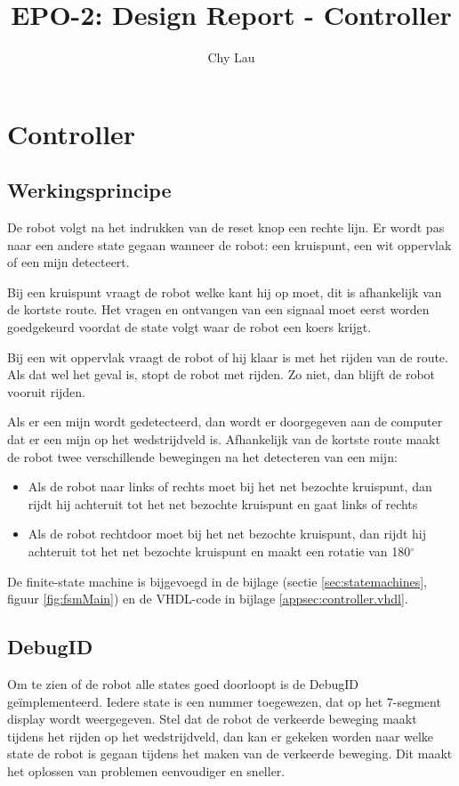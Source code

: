 \documentclass{report}
\title{EPO-2: Design Report - Controller}
\author{Chy Lau}
\begin{document}
\chapter{Controller}
\label{ch:controller}

\section{Werkingsprincipe}
De robot volgt na het indrukken van de reset knop een rechte lijn.
Er wordt pas naar een andere state gegaan wanneer de robot: een kruispunt, een wit oppervlak of een mijn detecteert.


Bij een kruispunt vraagt de robot welke kant hij op moet, dit is afhankelijk van de kortste route.
Het vragen en ontvangen van een signaal moet eerst worden goedgekeurd voordat de state volgt waar de robot een koers krijgt.


Bij een wit oppervlak vraagt de robot of hij klaar is met het rijden van de route.
Als dat wel het geval is, stopt de robot met rijden.
Zo niet, dan blijft de robot vooruit rijden.

Als er een mijn wordt gedetecteerd, dan wordt er doorgegeven aan de computer dat er een mijn op het wedstrijdveld is. 
Afhankelijk van de kortste route maakt de robot twee verschillende bewegingen na het detecteren van een mijn:
\begin{itemize}
\item Als de robot naar links of rechts moet bij het net bezochte kruispunt, dan rijdt hij achteruit tot het net bezochte kruispunt en gaat links of rechts
\item Als de robot rechtdoor moet bij het net bezochte kruispunt, dan rijdt hij achteruit tot het net bezochte kruispunt en maakt een rotatie van 180$^\circ$
\end{itemize}

De finite-state machine is bijgevoegd in de bijlage (sectie \ref{sec:statemachines}, figuur \ref{fig:fsmMain}) en de VHDL-code in bijlage \ref{appsec:controller.vhdl}.

\section{DebugID}
Om te zien of de robot alle states goed doorloopt is de DebugID geïmplementeerd.
Iedere state is een nummer toegewezen, dat op het 7-segment display wordt weergegeven.
Stel dat de robot de verkeerde beweging maakt tijdens het rijden op het wedstrijdveld, dan kan er gekeken worden naar welke state de robot is gegaan tijdens het maken van de verkeerde beweging.
Dit maakt het oplossen van problemen eenvoudiger en sneller.
\end{document}
